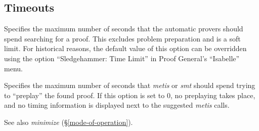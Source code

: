\documentclass[a4paper,12pt]{article}
\begin{document}
\subsection{Timeouts}
\label{timeouts}

\begin{enum}
Specifies the maximum number of seconds that the automatic provers should spend
searching for a proof. This excludes problem preparation and is a soft limit.
For historical reasons, the default value of this option can be overridden using
the option ``Sledgehammer: Time Limit'' in Proof General's ``Isabelle'' menu.

Specifies the maximum number of seconds that \textit{metis} or \textit{smt}
should spend trying to ``preplay'' the found proof. If this option is set to 0,
no preplaying takes place, and no timing information is displayed next to the
suggested \textit{metis} calls.

\nopagebreak
{\small See also \textit{minimize} (\S\ref{mode-of-operation}).}
\end{enum}

\let\em=\sl
{}

\end{document}
